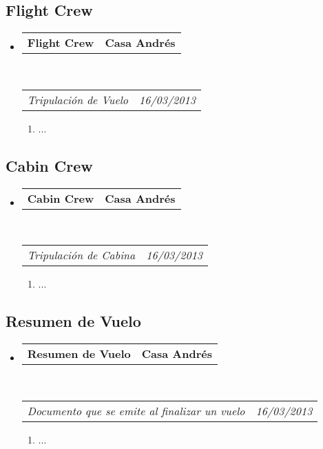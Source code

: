 \documentclass[10pt,letterpaper]{article}
\makeatletter
\newcommand{\headerrow}[2]
{\begin{tabular*}{\linewidth}{l@{\extracolsep{\fill}}r}
	#1 &
	#2 \\
\end{tabular*}}
\makeatother
\begin{document}
\subsection*{Flight Crew}

\begin{itemize}
	\parskip=0.1em

	\item
	\headerrow
		{\textbf{Flight Crew}}
		{\textbf{Casa Andrés}}
	\\
	\headerrow
		{\emph{Tripulación de Vuelo}}
		{\emph{16/03/2013}}
	\begin{enumerate}
		\item ...
	\end{enumerate}

\end{itemize}

\subsection*{Cabin Crew}

\begin{itemize}
	\parskip=0.1em

	\item
	\headerrow
		{\textbf{Cabin Crew}}
		{\textbf{Casa Andrés}}
	\\
	\headerrow
		{\emph{Tripulación de Cabina}}
		{\emph{16/03/2013}}
	\begin{enumerate}
		\item ...
	\end{enumerate}

\end{itemize}

\subsection*{Resumen de Vuelo}

\begin{itemize}
	\parskip=0.1em

	\item
	\headerrow
		{\textbf{Resumen de Vuelo}}
		{\textbf{Casa Andrés}}
	\\
	\headerrow
		{\emph{Documento que se emite al finalizar un vuelo}}
		{\emph{16/03/2013}}
	\begin{enumerate}
		\item ...
	\end{enumerate}

\end{itemize}
\end{document}
